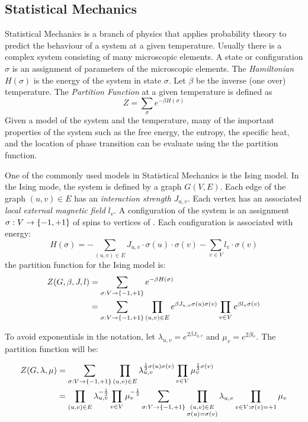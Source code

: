 \subsection*{Statistical Mechanics}
Statistical Mechanics is a branch of physics that applies probability theory to
predict the behaviour of a system at a given temperature. Usually there is a complex system
consisting of many microscopic elements. A state or configuration \(\sigma\) is an assignment of
parameters of the microscopic elements. 
The \emph{Hamiltonian} \(H(\sigma)\) is the energy of the system in state \(\sigma\)\@. 
Let \(\beta\) be the inverse (one over) temperature. 
The \emph{Partition Function} at a given temperature is defined as
\[Z=\sum_\sigma e^{-\beta H(\sigma)}\]
Given a model of the system and the temperature,
many of the important properties of the system such as the free energy, the entropy, the specific heat, and the location of phase transition can be evaluate using the the partition function.

One of the commonly used models in Statistical Mechanics is the Ising model. In the Ising mode,
the system is defined by a graph \(G(V,E)\)\@.
Each edge of the graph \((u,v)\in E\) has an {\em interaction strength} \(J_{u,v}\)\@. Each
vertex has an associated \emph{local external magnetic field} \(l_v\)\@.
A configuration of the system  is an assignment \(\sigma: V\to \{{-1,+1}\}\) of spins to
vertices of \mG. Each configuration is associated with energy:
\[H(\sigma)=-\sum_{(u,v)\in E}J_{u,v}\cdot\sigma(u)\cdot\sigma(v)-\sum_{v\in V} l_v\cdot\sigma(v)\]
the partition function for the Ising model is:
\begin{align*}
Z(G,\beta,J,l)&=\sum_{\sigma:V\to\{{-1,+1}\}}e^{-\beta H(\sigma)}\\
&=\sum_{\sigma:V\to\{{-1,+1}\}} \prod_{(u,v)\in E}
e^{\beta J_{u,v}\sigma(u)\sigma(v)} \prod_{v\in V} 
e^{\beta l_v\sigma(v)}
\end{align*}

To avoid exponentials in the notation, let \(\lambda_{u,v}=e^{2\beta J_{u,v}}\) and 
\(\mu_{v}=e^{2\beta l_v}\). The partition function will be:

\begin{align*}
Z(G,\lambda,\mu)&=\sum_{\sigma :V\to\{{-1,+1}\}} \prod_{(u,v)\in E} \lambda_{u,v}^{\frac{1}{2}
\sigma(u)\sigma(v)}\prod_{v\in V}\mu_v^{\frac{1}{2}\sigma(v)}\\
&=\prod_{(u,v)\in E}\lambda_{u,v}^{-\frac{1}{2}}\prod_{v\in V}\mu_v^{-\frac{1}{2}}\sum_{\sigma:V\to
\{{-1,+1}\}}
\prod_{\substack{(u,v)\in E \\ \sigma(u)=\sigma(v)}}\lambda_{u,v}\prod_{v\in V:
\sigma(v)=+1}\mu_v
\end{align*}

